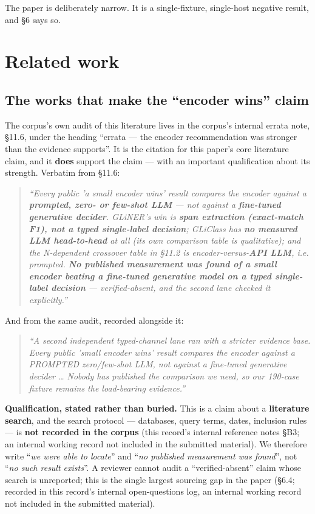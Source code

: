 \documentclass[10pt]{article}
\begin{document}
The paper is deliberately narrow. It is a single-fixture, single-host negative result, and \S6 says so.

\section{Related work}

\subsection{The works that make the ``encoder wins'' claim}

The corpus's own audit of this literature lives in the corpus's internal errata note, \S11.6\cite{source_corpus_errata_2026}, under the heading ``errata --- the encoder recommendation was stronger than the evidence supports''. It is the citation for this paper's core literature claim, and it \textbf{does} support the claim --- with an important qualification about its strength. Verbatim from \S11.6:

\begin{quote}
\emph{``Every public 'a small encoder wins' result compares the encoder against a \textbf{prompted, zero- or few-shot LLM} --- not against a \textbf{fine-tuned generative decider}. GLiNER's win is \textbf{span extraction (exact-match F1), not a typed single-label decision}; GLiClass has \textbf{no measured LLM head-to-head} at all (its own comparison table is qualitative); and the N-dependent crossover table in \S11.2 is encoder-versus-\textbf{API LLM}, i.e. prompted. \textbf{No published measurement was found of a small encoder beating a fine-tuned generative model on a typed single-label decision} --- verified-absent, and the second lane checked it explicitly.''}
\end{quote}

And from the same audit, recorded alongside it:

\begin{quote}
\emph{``A second independent typed-channel lane ran with a stricter evidence base. Every public 'small encoder wins' result compares the encoder against a PROMPTED zero/few-shot LLM, not against a fine-tuned generative decider \ldots{} Nobody has published the comparison we need, so our 190-case fixture remains the load-bearing evidence.''}
\end{quote}

\textbf{Qualification, stated rather than buried.} This is a claim about a \textbf{literature search}, and the search protocol --- databases, query terms, dates, inclusion rules --- is \textbf{not recorded in the corpus} (this record's internal reference notes \S{}B3; an internal working record not included in the submitted material). We therefore write ``\emph{we were able to locate}'' and ``\emph{no published measurement was found}'', not ``\emph{no such result exists}''. A reviewer cannot audit a ``verified-absent'' claim whose search is unreported; this is the single largest sourcing gap in the paper (\S6.4; recorded in this record's internal open-questions log, an internal working record not included in the submitted material).
\end{document}
